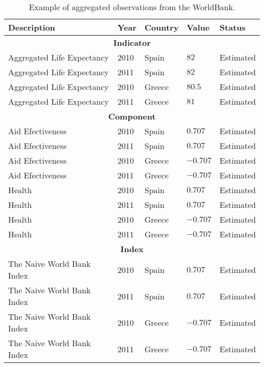 \begin{table}[!htb]
\renewcommand{\arraystretch}{1.3}
\scriptsize
\begin{center}
\begin{tabular}{|p{4.5cm}|p{1cm}|p{1.5cm}|p{1cm}|p{1.8cm}|}
\hline
  \textbf{Description} & \textbf{Year} & \textbf{Country} & \textbf{Value} & \textbf{Status} \\  \hline
  \multicolumn{5}{|c|}{\textbf{Indicator}} \\ \hline
  Aggregated Life Expectancy  & 2010 & Spain & $82$ & Estimated \\ \hline
  Aggregated Life Expectancy  & 2011 & Spain & $82$ & Estimated \\ \hline
  Aggregated Life Expectancy  & 2010 & Greece & $80.5$ & Estimated \\ \hline
  Aggregated Life Expectancy  & 2011 & Greece & $81$ & Estimated \\ \hline
  \multicolumn{5}{|c|}{\textbf{Component}} \\ \hline
  Aid Efectiveness  & 2010 & Spain & $0.707$  & Estimated \\ \hline
  Aid Efectiveness  & 2011 & Spain & $0.707$  & Estimated \\ \hline
  Aid Efectiveness  & 2010 & Greece & $-0.707$ & Estimated \\ \hline
  Aid Efectiveness  & 2011 & Greece & $-0.707$ & Estimated \\ \hline
  Health & 2010 & Spain & $0.707$ & Estimated \\ \hline
  Health & 2011 & Spain & $0.707$ & Estimated \\ \hline
  Health & 2010 & Greece & $-0.707$ & Estimated \\ \hline
  Health & 2011 & Greece & $-0.707$ & Estimated \\ \hline
 \multicolumn{5}{|c|}{\textbf{Index}} \\ \hline
  The Naive World Bank Index & 2010 & Spain & $0.707$ & Estimated \\ \hline
  The Naive World Bank Index & 2011 & Spain & $0.707$ & Estimated \\ \hline
  The Naive World Bank Index & 2010 & Greece & $-0.707$ & Estimated \\ \hline
  The Naive World Bank Index & 2011 & Greece & $-0.707$ & Estimated\\ \hline
  \hline
  \end{tabular}
  \caption{Example of aggregated observations from the WorldBank.}
  \label{tab:example-generated-wb}
  \end{center}	 
\end{table} 



